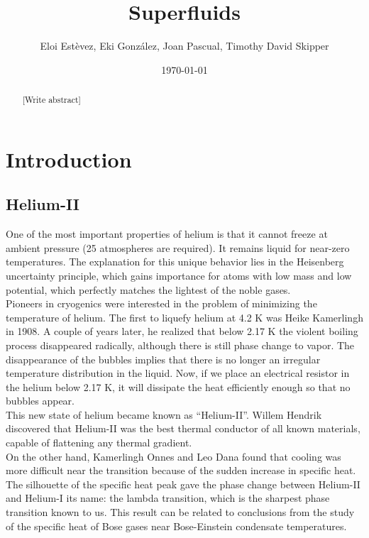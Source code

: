 \documentclass{article}
\title{Superfluids}
\author{Eloi Estèvez, Eki González, Joan Pascual, Timothy David Skipper}
\date{\today}
\begin{document}
\maketitle
\begin{abstract}
[Write abstract]
\end{abstract}



\section{Introduction}

\subsection{Helium-II}
One of the most important properties of helium is that it cannot freeze at ambient pressure (25 atmospheres are required). It remains liquid for near-zero temperatures. The explanation for this unique behavior lies in the Heisenberg uncertainty principle, which gains importance for atoms with low mass and low potential, which perfectly matches the lightest of the noble gases.
\\

Pioneers in cryogenics were interested in the problem of minimizing the temperature of helium. The first to liquefy helium at 4.2 K was Heike Kamerlingh in 1908. A couple of years later, he realized that below 2.17 K the violent boiling process disappeared radically, although there is still phase change to vapor. The disappearance of the bubbles implies that there is no longer an irregular temperature distribution in the liquid. Now, if we place an electrical resistor in the helium below 2.17 K, it will dissipate the heat efficiently enough so that no bubbles appear. 
\\

This new state of helium became known as “Helium-II”. Willem Hendrik discovered that Helium-II was the best thermal conductor of all known materials, capable of flattening any thermal gradient. 
\\

On the other hand, Kamerlingh Onnes and Leo Dana found that cooling was more difficult near the transition because of the sudden increase in specific heat. The silhouette of the specific heat peak gave the phase change between Helium-II and Helium-I its name: the lambda transition, which is the sharpest phase transition known to us. This result can be related to conclusions from the study of the specific heat of Bose gases near Bose-Einstein condensate temperatures.
\\
\end{document}
